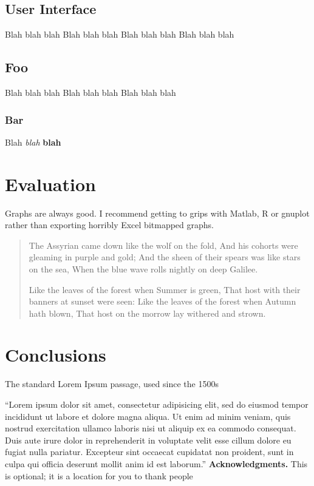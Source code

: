 \documentclass{mpaper}
\begin{document}
\subsection{User Interface}

Blah blah blah
Blah blah blah
Blah blah blah
Blah blah blah

\subsection{Foo}

Blah blah blah
Blah blah blah
Blah blah blah

\subsubsection{Bar}
\textsf{Blah} \textit{blah} \textbf{blah}

\section{Evaluation}

Graphs are always good. I recommend getting to grips with Matlab, R or
gnuplot rather than exporting horribly Excel bitmapped graphs.


\begin{quotation}
 The Assyrian came down like the wolf on the fold,
 And his cohorts were gleaming in purple and gold;
 And the sheen of their spears was like stars on the sea,
 When the blue wave rolls nightly on deep Galilee.

 Like the leaves of the forest when Summer is green,
 That host with their banners at sunset were seen:
 Like the leaves of the forest when Autumn hath blown,
 That host on the morrow lay withered and strown.
\end{quotation}

\section{Conclusions}

The standard Lorem Ipsum passage, used since the 1500s

``Lorem ipsum dolor sit amet, consectetur adipisicing elit, sed do eiusmod tempor incididunt ut labore et dolore magna aliqua. Ut enim ad minim veniam, quis nostrud exercitation ullamco laboris nisi ut aliquip ex ea commodo consequat. Duis aute irure dolor in reprehenderit in voluptate velit esse cillum dolore eu fugiat nulla pariatur. Excepteur sint occaecat cupidatat non proident, sunt in culpa qui officia deserunt mollit anim id est laborum.''
\vskip8pt \noindent
{\bf Acknowledgments.}
This is optional; it is a location for you to thank people



\end{document}
